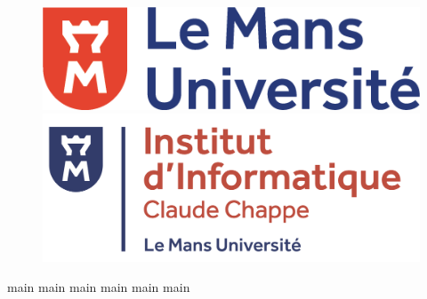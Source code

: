\documentclass[a4paper,11pt]{article}
\title{\univ\\\textbf{\titre}}
\author{\auteur}
\begin{document}
	\begin{figure}
		\includegraphics[scale=0.25]{Annexe/logo_LMU.png}
		\hfill
		\includegraphics[scale=0.15]{Annexe/logo_ic2.png}
	\end{figure}
	\vfill

	\maketitle
	\vfill
	\newpage

	\tableofcontents
	\newpage

	{main}
	{main}
	{main}
	{main}
	{main}
	{main}
\end{document}
